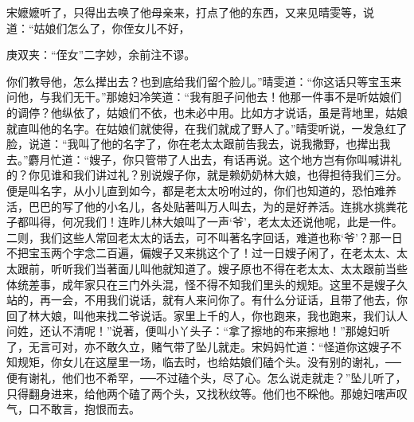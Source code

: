 \begin{parag}
    宋嬷嬷听了，只得出去唤了他母亲来，打点了他的东西，又来见晴雯等，说道：“姑娘们怎么了，你侄女儿不好，\begin{note}庚双夹：“侄女”二字妙，余前注不谬。\end{note}你们教导他，怎么撵出去？也到底给我们留个脸儿。”晴雯道：“你这话只等宝玉来问他，与我们无干。”那媳妇冷笑道：“我有胆子问他去！他那一件事不是听姑娘们的调停？他纵依了，姑娘们不依，也未必中用。比如方才说话，虽是背地里，姑娘就直叫他的名字。在姑娘们就使得，在我们就成了野人了。”晴雯听说，一发急红了脸，说道：“我叫了他的名字了，你在老太太跟前告我去，说我撒野，也撵出我去。”麝月忙道：“嫂子，你只管带了人出去，有话再说。这个地方岂有你叫喊讲礼的？你见谁和我们讲过礼？别说嫂子你，就是赖奶奶林大娘，也得担待我们三分。便是叫名字，从小儿直到如今，都是老太太吩咐过的，你们也知道的，恐怕难养活，巴巴的写了他的小名儿，各处贴著叫万人叫去，为的是好养活。连挑水挑粪花子都叫得，何况我们！连昨儿林大娘叫了一声‘爷’，老太太还说他呢，此是一件。二则，我们这些人常回老太太的话去，可不叫著名字回话，难道也称‘爷’？那一日不把宝玉两个字念二百遍，偏嫂子又来挑这个了！过一日嫂子闲了，在老太太、太太跟前，听听我们当著面儿叫他就知道了。嫂子原也不得在老太太、太太跟前当些体统差事，成年家只在三门外头混，怪不得不知我们里头的规矩。这里不是嫂子久站的，再一会，不用我们说话，就有人来问你了。有什么分证话，且带了他去，你回了林大娘，叫他来找二爷说话。家里上千的人，你也跑来，我也跑来，我们认人问姓，还认不清呢！”说著，便叫小丫头子：“拿了擦地的布来擦地！”那媳妇听了，无言可对，亦不敢久立，赌气带了坠儿就走。宋妈妈忙道：“怪道你这嫂子不知规矩，你女儿在这屋里一场，临去时，也给姑娘们磕个头。没有别的谢礼，──便有谢礼，他们也不希罕，──不过磕个头，尽了心。怎么说走就走？”坠儿听了，只得翻身进来，给他两个磕了两个头，又找秋纹等。他们也不睬他。那媳妇嗐声叹气，口不敢言，抱恨而去。
\end{parag}


